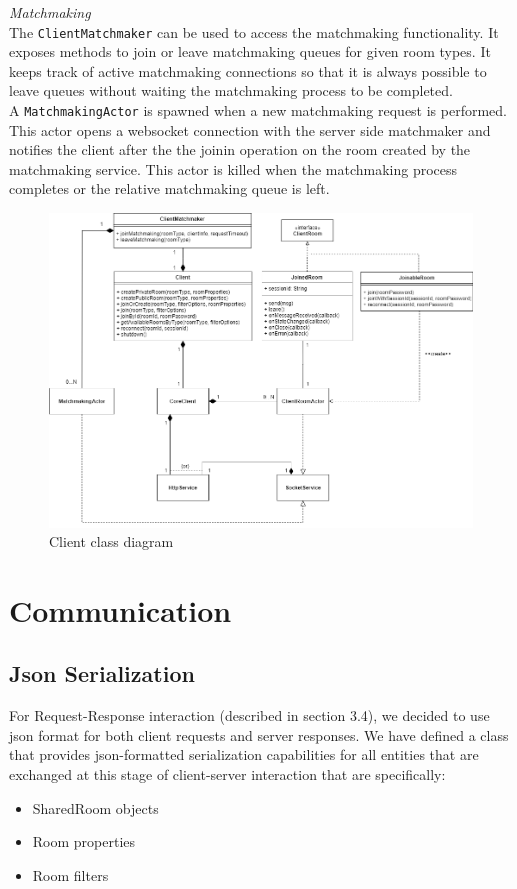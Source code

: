 \bigskip
\textit{Matchmaking}
\\
The \texttt{ClientMatchmaker} can be used to access the matchmaking functionality. It exposes methods to join or leave matchmaking queues for given room types. It keeps track of active matchmaking connections so that it is always possible to leave queues without waiting the matchmaking process to be completed.
\\
A \texttt{MatchmakingActor} is spawned when a new matchmaking request is performed. 
This actor opens a websocket connection with the server side matchmaker and notifies the client after the the joinin operation on the room created by the matchmaking service. This actor is killed when the matchmaking process completes or the relative matchmaking queue is left.

\begin{figure}
	\hspace*{-1 in}
	\includegraphics[scale=0.55]{images/4-design/client_class.png}
	\caption{Client class diagram}
	\label{fig:client_class_diagram}
\end{figure}

\section{Communication}\label{sec:communication_design}


\subsection{Json Serialization}
For Request-Response interaction (described in section 3.4), we decided to use json format for both client requests and server responses. We have defined a class that provides json-formatted serialization capabilities for all entities that are exchanged at this stage of client-server interaction that are specifically:
\begin{itemize}
	\item SharedRoom objects
	\item Room properties
	\item Room filters
\end{itemize}

